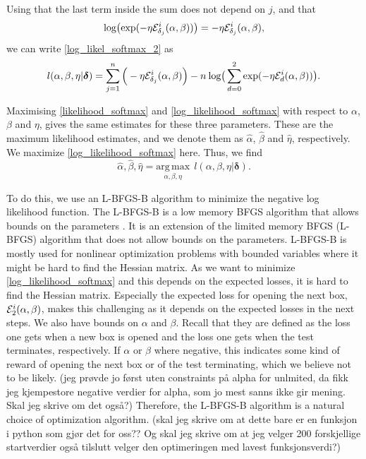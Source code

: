 Using that the last term inside the sum does not depend on $j$, and that 
\begin{equation*}
    \text{log} \big( \text{exp}(- \eta \mathcal{E}^i_{\delta_{j}}(\alpha, \beta))\big)
    = - \eta \mathcal{E}^i_{\delta_{j}}(\alpha, \beta),
\end{equation*}
we can write \eqref{log_likel_softmax_2} as
\begin{equation}
\label{log_likelihood_softmax}
    \begin{aligned}
       l(\alpha,\beta,\eta|\boldsymbol{\delta}) 
       = \sum_{j=1}^n \Big( - \eta \mathcal{E}^i_{\delta_{j}}(\alpha, \beta) \Big)
       - n \: \text{log} \big( \sum_{d=0}^{2} \text{exp}(-\eta \mathcal{E}^i_{d}(\alpha, \beta)) \big).
    \end{aligned}
\end{equation}

Maximising \eqref{likelihood_softmax} and \eqref{log_likelihood_softmax} with respect to $\alpha$, $\beta$ and $\eta$, gives the same estimates for these three parameters. These are the maximum likelihood estimates, and we denote them as $\hat{\alpha}$, $\hat{\beta}$ and $\hat{\eta}$, respectively. We maximize \eqref{log_likelihood_softmax} here. Thus, we find
\begin{equation}
    \hat{\alpha},\hat{\beta},\hat{\eta} = \underset{\alpha,\beta,\eta}{\mathrm{arg}\,\mathrm{max}}\:\: l(\alpha,\beta,\eta|\boldsymbol{\delta}) .
\end{equation}

To do this, we use an L-BFGS-B algorithm to minimize the negative log likelihood function. The L-BFGS-B is a low memory BFGS algorithm that allows bounds on the parameters \citep{optimization2}. It is an extension of the limited memory BFGS (L-BFGS) algorithm that does not allow bounds on the parameters. L-BFGS-B is mostly used for nonlinear optimization problems with bounded variables where it might be hard to find the Hessian matrix.
As we want to minimize \eqref{log_likelihood_softmax} and this depends on the expected losses, it is hard to find the Hessian matrix. Especially the expected loss for opening the next box, $\mathcal{E}_2^i(\alpha,\beta)$, makes this challenging as it depends on the expected losses in the next steps. We also have bounds on $\alpha$ and $\beta$. Recall that they are defined as the loss one gets when a new box is opened and the loss one gets when the test terminates, respectively. If $\alpha$ or $\beta$ where negative, this indicates some kind of reward of opening the next box or of the test terminating, which we believe not to be likely. (jeg prøvde jo først uten constraints på alpha for unlmited, da fikk jeg kjempestore negative verdier for alpha, som jo mest sanns ikke gir mening. Skal jeg skrive om det også?) Therefore, the L-BFGS-B algorithm is a natural choice of optimization algorithm. 
(skal jeg skrive om at dette bare er en funksjon i python som gjør det for oss?? Og skal jeg skrive om at jeg velger 200 forskjellige startverdier også tilslutt velger den optimeringen med lavest funksjonsverdi?)


